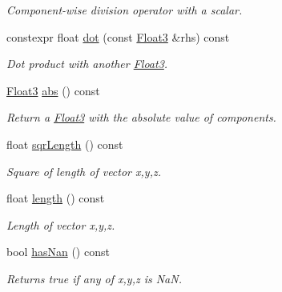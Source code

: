 \begin{DoxyCompactItemize}
\begin{DoxyCompactList}\small\item\em Component-\/wise division operator with a scalar. \end{DoxyCompactList}\item 
constexpr float \hyperlink{structcpom_1_1_float3_a88ab6cfbb163b379ee9cf610affc0a10}{dot} (const \hyperlink{structcpom_1_1_float3}{Float3} \&rhs) const \hypertarget{structcpom_1_1_float3_a88ab6cfbb163b379ee9cf610affc0a10}{}\label{structcpom_1_1_float3_a88ab6cfbb163b379ee9cf610affc0a10}

\begin{DoxyCompactList}\small\item\em Dot product with another \hyperlink{structcpom_1_1_float3}{Float3}. \end{DoxyCompactList}\item 
\hyperlink{structcpom_1_1_float3}{Float3} \hyperlink{structcpom_1_1_float3_ac45b12d3096b1cb12aec1fb431a48eca}{abs} () const \hypertarget{structcpom_1_1_float3_ac45b12d3096b1cb12aec1fb431a48eca}{}\label{structcpom_1_1_float3_ac45b12d3096b1cb12aec1fb431a48eca}

\begin{DoxyCompactList}\small\item\em Return a \hyperlink{structcpom_1_1_float3}{Float3} with the absolute value of components. \end{DoxyCompactList}\item 
float \hyperlink{structcpom_1_1_float3_a972b777795826ce5c44b5ce5dd87ed62}{sqr\+Length} () const \hypertarget{structcpom_1_1_float3_a972b777795826ce5c44b5ce5dd87ed62}{}\label{structcpom_1_1_float3_a972b777795826ce5c44b5ce5dd87ed62}

\begin{DoxyCompactList}\small\item\em Square of length of vector x,y,z. \end{DoxyCompactList}\item 
float \hyperlink{structcpom_1_1_float3_a2bf55c619a8050c0b0c7af6d53e08092}{length} () const \hypertarget{structcpom_1_1_float3_a2bf55c619a8050c0b0c7af6d53e08092}{}\label{structcpom_1_1_float3_a2bf55c619a8050c0b0c7af6d53e08092}

\begin{DoxyCompactList}\small\item\em Length of vector x,y,z. \end{DoxyCompactList}\item 
bool \hyperlink{structcpom_1_1_float3_a6d1df69dd120f1410c654185a06e58d1}{has\+Nan} () const \hypertarget{structcpom_1_1_float3_a6d1df69dd120f1410c654185a06e58d1}{}\label{structcpom_1_1_float3_a6d1df69dd120f1410c654185a06e58d1}

\begin{DoxyCompactList}\small\item\em Returns true if any of x,y,z is NaN. \end{DoxyCompactList}\end{DoxyCompactItemize}
